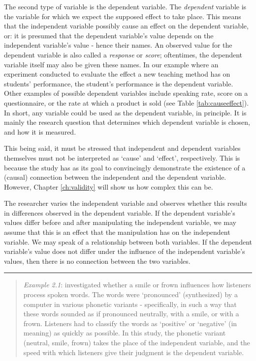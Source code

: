 \documentclass[
]{book}
\begin{document}
The second type of variable is the dependent variable. The \emph{dependent} variable is the variable for which we expect the supposed effect to take place. This means that the independent variable possibly cause an effect on the dependent variable, or: it is presumed that the dependent variable's value depends on the independent variable's value - hence their names. An observed value for the dependent variable is also called a \emph{response} or \emph{score}; oftentimes, the dependent variable itself may also be given these names. In our example where an experiment conducted to evaluate the effect a new teaching method has on students' performance, the student's performance is the dependent variable. Other examples of possible dependent variables include speaking rate, score on a questionnaire, or the rate at which a product is sold (see Table \ref{tab:causeeffect}). In short, any variable could be used as the dependent variable, in principle. It is mainly the research question that determines which dependent variable is chosen, and how it is measured.

This being said, it must be stressed that independent and dependent variables themselves must not be interpreted as `cause' and `effect', respectively. This is because the study has as its goal to convincingly demonstrate the existence of a (causal) connection between the independent and the dependent variable. However, Chapter \ref{ch:validity} will show us how complex this can be.

The researcher varies the independent variable and observes whether this results in differences observed in the dependent variable. If the dependent variable's values differ before and after manipulating the independent variable, we may assume that this is an effect that the manipulation has on the independent variable. We may speak of a relationship between both variables. If the dependent variable's value does not differ under the influence of the independent variable's values, then there is no connection between the two variables.

\begin{center}\rule{0.5\linewidth}{0.5pt}\end{center}

\begin{quote}
\emph{Example 2.1}:
\citet{QSF12} investigated whether a smile or frown influences how listeners process spoken words. The words were `pronounced' (synthesized) by a computer in various phonetic variants - specifically, in such a way that these words sounded as if pronounced neutrally, with a smile, or with a frown. Listeners had to classify the words as `positive' or `negative' (in meaning) as quickly as possible. In this study, the phonetic variant (neutral, smile, frown) takes the place of the independent variable, and the speed with which listeners give their judgment is the dependent variable.
\end{quote}
\end{document}
